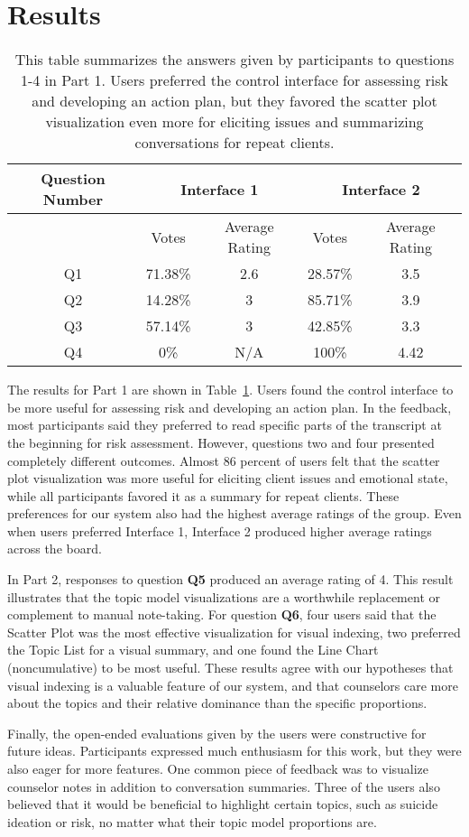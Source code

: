 \section{Results}

\begin{table}[h]
  \centering
  \begin{tabular}{| c | c c | c c |}
    \hline
    Question Number & \multicolumn{2}{|c|}{Interface 1} & \multicolumn{2}{|c|}{Interface 2} \\
    \hline \hline
    & Votes & Average Rating & Votes & Average Rating \\
    \hline
    Q1 & 71.38\% & 2.6 & 28.57\% & 3.5 \\
    Q2 & 14.28\% & 3 & 85.71\% & 3.9 \\
    Q3 & 57.14\% & 3 & 42.85\% & 3.3 \\
    Q4 & 0\% & N/A & 100\% & 4.42 \\
    \hline
  \end{tabular}
  \caption{This table summarizes the answers given by participants to questions 1-4 in Part 1. Users preferred the control interface for assessing risk and developing an action plan, but they favored the scatter plot visualization even more for eliciting issues and summarizing conversations for repeat clients.}
  \label{tab:results}
\end{table}

The results for Part 1 are shown in Table~\ref{tab:results}. Users found the control interface to be more useful for assessing risk and developing an action plan. In the feedback, most participants said they preferred to read specific parts of the transcript at the beginning for risk assessment. However, questions two and four presented completely different outcomes. Almost 86 percent of users felt that the scatter plot visualization was more useful for eliciting client issues and emotional state, while all participants favored it as a summary for repeat clients. These preferences for our system also had the highest average ratings of the group. Even when users preferred Interface 1, Interface 2 produced higher average ratings across the board.

In Part 2, responses to question \textbf{Q5} produced an average rating of 4. This result illustrates that the topic model visualizations are a worthwhile replacement or complement to manual note-taking. For question \textbf{Q6}, four users said that the Scatter Plot was the most effective visualization for visual indexing, two preferred the Topic List for a visual summary, and one found the Line Chart (noncumulative) to be most useful. These results agree with our hypotheses that visual indexing is a valuable feature of our system, and that counselors care more about the topics and their relative dominance than the specific proportions.

Finally, the open-ended evaluations given by the users were constructive for future ideas. Participants expressed much enthusiasm for this work, but they were also eager for more features. One common piece of feedback was to visualize counselor notes in addition to conversation summaries. Three of the users also believed that it would be beneficial to highlight certain topics, such as suicide ideation or risk, no matter what their topic model proportions are.
